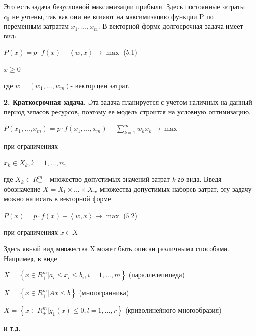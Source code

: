 \documentclass[12pt, 4paper]{book}
\begin{document}
{Это есть задача безусловной максимизации прибыли. Здесь постоянные затраты $c_0$ не учтены, так как они не влияют на максимизацию функции P по переменным затратам $x_1,...,x_m$. В векторной форме долгосрочная задача имеет вид: 
\begin{center}
$P(x) = p \cdot f(x) - \left\langle w,x\right\rangle \rightarrow \max$ (5.1)
\end{center}
\begin{center}
$x \geq 0$
\end{center}
где  $w = (w_1,...,w_m)$- вектор цен затрат. 
\par

\textbf{2.	Краткосрочная задача.} 
Эта задача планируется с учетом наличных на данный период запасов ресурсов, поэтому ее модель строится на условную оптимизацию: 
\begin{center}
$P(x_1,...,x_m) = p \cdot f(x_1,...,x_m) - \sum\limits_{k=1}^{m}w_k x_k \rightarrow \max$
\end{center}
\begin{center}
при ограничениях
\end{center}
\begin{center}
$x_k \in X_k,k=1,...,m$,
\end{center}
где  $X_k \subset R_{+}^{m}$ - множество допустимых значений затрат \textit{k-го} вида. Введя обозначение $X = X_1 \times ... \times X_m$ множества допустимых наборов затрат, эту задачу можно написать в векторной форме 
\begin{center}
$P(x)=p\cdot f(x) - \left\langle w,x \right\rangle \rightarrow \max$ (5.2)
\end{center}
при ограничениях $x \in X$
\par

Здесь явный вид множества X может быть описан различными способами. Например, в виде 
\begin{center}
$X = \left\{x \in R_{+}^{m}| a_i \leq x_i \leq b_i, i=1,...,m \right\}$ (параллелепипеда)
\end{center}
\begin{center}
$X = \left\{x \in R_{+}^{m}| Ax \leq b \right\}$ (многогранника)
\end{center}
\begin{center}
$X = \left\{x \in R_{+}^{m}|g_1(x) \leq 0, l=1,...,r \right\}$ (криволинейного многообразия)
\end{center}
и т.д.
\par

}
\end{document}
